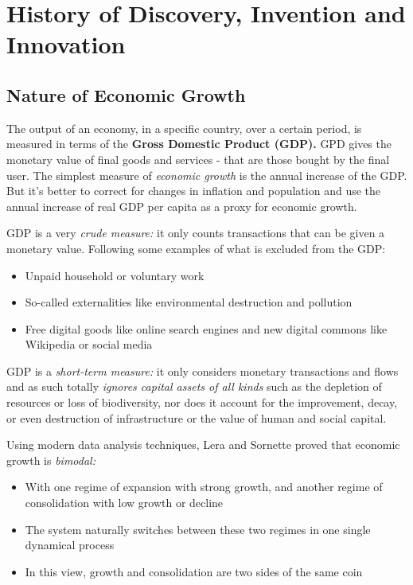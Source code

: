 \documentclass[a4paper]{extarticle}
\begin{document}
\section{History of Discovery, Invention and Innovation}

\subsection{Nature of Economic Growth}

The output of an economy, in a specific country, over a certain period, is measured in terms of the \textbf{Gross Domestic Product (GDP).} GPD gives the monetary value of final goods and services - that are those bought by the final user. The simplest measure of \textit{economic growth} is the annual increase of the GDP. But it's better to correct for changes in inflation and population and use the annual increase of real GDP per capita as a proxy for economic growth.

GDP is a very \textit{crude measure:} it only counts transactions that can be given a monetary value. Following some examples of what is excluded from the GDP:

\begin{itemize}
    \item Unpaid household or voluntary work
    \item So-called externalities like environmental destruction and pollution
    \item Free digital goods like online search engines and new digital commons like Wikipedia or social media
\end{itemize}

GDP is a \textit{short-term measure:} it only considers monetary transactions and flows and as such totally \textit{ignores capital assets of all kinds} such as the depletion of resources or loss of biodiversity, nor does it account for the improvement, decay, or even destruction of infrastructure or the value of human and social capital.

Using modern data analysis techniques, Lera and Sornette proved that economic growth is \textit{bimodal:}

\begin{itemize}
    \item With one regime of expansion with strong growth, and another regime of consolidation with low growth or decline
    \item The system naturally switches between these two regimes in one single dynamical process
    \item In this view, growth and consolidation are two sides of the same coin
\end{itemize}
\end{document}
